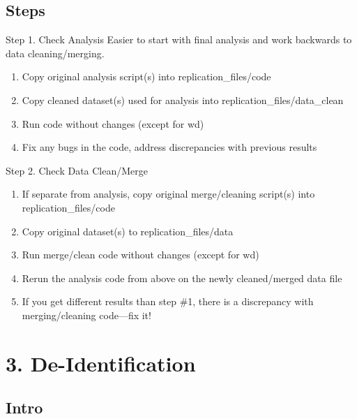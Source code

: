 \documentclass[12pt, compress]{beamer} %
\renewcommand{\texttt}[2][ceruleanblue]{\textcolor{#1}{\ttfamily #2}}%
\let\olditem\item %
\renewcommand{\item}{%
\olditem\vspace{\fill}}
\begin{document}
	\subsection{Steps}
		\begin{frame}{Step 1. Check Analysis}
			Easier to start with final analysis and work backwards to data cleaning/merging. 
			\begin{enumerate}
				\item Copy original analysis script(s) into \texttt{replication\_files/code}
				\item Copy cleaned dataset(s) used for analysis into \texttt{replication\_files/data\_clean}
				\item Run code without changes (except for wd)
				\item Fix any bugs in the code, address discrepancies with previous results
			\end{enumerate}
		\end{frame}
		
		\begin{frame}{Step 2. Check Data Clean/Merge}
			\begin{enumerate}
				\item If separate from analysis, copy original merge/cleaning script(s) into \texttt{replication\_files/code}
				\item Copy original dataset(s) to \texttt{replication\_files/data}
				\item Run merge/clean code without changes (except for wd)
				\item Rerun the analysis code from above on the newly cleaned/merged data file
				\item If you get different results than step \#1, there is a discrepancy with  merging/cleaning code---fix it!
			\end{enumerate}
		\end{frame}


 \section{3. De-Identification}

\subsection{Intro}
\end{document}
